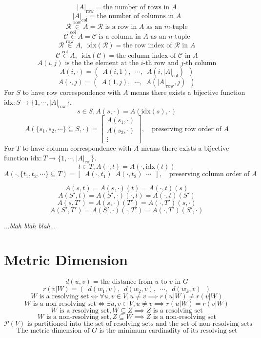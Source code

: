 \documentclass{article}
\begin{document}
\[ |A|_{\mathrm{row}} = \text{the number of rows in } A \]
\[ |A|_{\mathrm{col}} = \text{the number of columns in } A \]
\[ \mathcal{R} \overset{\mathrm{row}}{\in} A = \mathcal{R} \text{ is a row in } A  \text{ as an } m \text{-tuple} \]
\[ \mathcal{C} \overset{\mathrm{col}}{\in} A = \mathcal{C} \text{ is a column in } A  \text{ as an } n \text{-tuple} \]
\[ \mathcal{R} \overset{\mathrm{row}}{\in} A,\enspace \mathrm{idx}(\mathcal{R}) = \text{the row index of } \mathcal{R}  \text{ in } A \]
\[ \mathcal{C} \overset{\mathrm{col}}{\in} A,\enspace \mathrm{idx}(\mathcal{C}) = \text{the column index of } \mathcal{C}  \text{ in } A \]
\[ A(i, j) \text{ is the the element at the } i \text{-th row and } j \text{-th column} \]
\[ A(i, \cdot) = (\enspace A(i, 1),\enspace \cdots,\enspace A(i, |A|_{\mathrm{col}})\enspace ) \]
\[ A(\cdot, j) = (\enspace A(1, j),\enspace \cdots,\enspace A(|A|_{\mathrm{row}}, j)\enspace ) \]
For \(S\) to have row correspondence with \(A\) means there exists a bijective function \(\mathrm{idx} : S \to \{1, \cdots, |A|_{\mathrm{row}}\}\).
\[ s \in S, A(s, \cdot) = A(\mathrm{idx}(s), \cdot) \]
\[
	A(\{s_1, s_2, \cdots\} \subseteq S, \cdot) = \left[
	\begin{array}{c}
		A(s_1, \cdot) \\
		A(s_2, \cdot) \\
		\vdots
	\end{array}
	\right],\quad \text{preserving row order of } A
\]
For \(T\) to have column correspondence with \(A\) means there exists a bijective function \(\mathrm{idx} : T \to \{1, \cdots, |A|_{\mathrm{col}}\}\).
\[ t \in T, A(\cdot, t) = A(\cdot, \mathrm{idx}(t)) \]
\[ A(\cdot, \{t_1, t_2, \cdots\} \subseteq T) = \left[\enspace A(\cdot, t_1)\enspace A(\cdot, t_2)\enspace \cdots\enspace \right],\quad \text{preserving column order of } A \]

\[ A(s, t) = A(s, \cdot)(t) = A(\cdot, t)(s) \]
\[ A(S', t) = A(S', \cdot)(\cdot, t) = A(\cdot, t)(S') \]
\[ A(s, T') = A(s, \cdot)(T') = A(\cdot, T')(s, \cdot) \]
\[ A(S', T') = A(S', \cdot)(\cdot, T') = A(\cdot, T')(S', \cdot) \]

...\textit{blah blah blah}...

\clearpage
\section{Metric Dimension}

\[ d(u, v) = \text{the distance from } u \text{ to } v \text{ in } G \]
\[ r(v|W) = (\enspace d(w_1, v),\enspace d(w_2, v),\enspace \cdots,\enspace d(w_k, v)\enspace ) \]
\[ W \text{ is a resolving set} \iff \forall u, v \in V, u \neq v \implies r(u|W) \neq r(v|W) \]
\[ W \text{ is a non-resolving set} \iff \exists u, v \in V, u \neq v \implies r(u|W) = r(v|W) \]
\[ W \text{ is a resolving set}, W \subseteq Z \implies Z \text{ is a resolving set} \]
\[ W \text{ is a non-resolving set}, Z \subseteq W \implies Z \text{ is a non-resolving set} \]
\[ \mathcal{P}(V) \text{ is partitioned into the set of resolving sets and the set of non-resolving sets} \]
\[ \text{The metric dimension of } G \text{ is the minimum cardinality of its resolving set} \]
\end{document}
